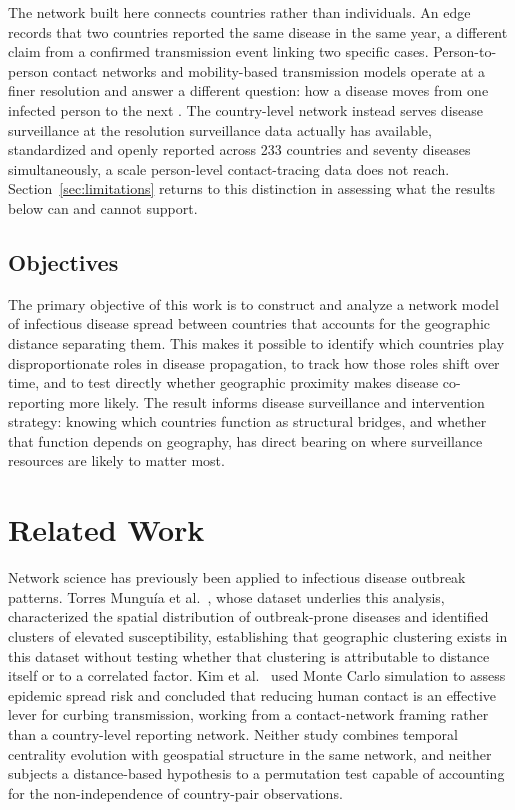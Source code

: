 \documentclass[11pt]{article}
\begin{document}
The network built here connects countries rather than individuals. An edge records that two
countries reported the same disease in the same year, a different claim from a confirmed
transmission event linking two specific cases. Person-to-person contact networks and
mobility-based transmission models operate at a finer resolution and answer a different
question: how a disease moves from one infected person to the next \cite{balcan2009}. The
country-level network instead serves disease surveillance at the resolution surveillance
data actually has available, standardized and openly reported across 233 countries and
seventy diseases simultaneously, a scale person-level contact-tracing data does not reach.
Section~\ref{sec:limitations} returns to this distinction in assessing what the results
below can and cannot support.

\subsection{Objectives}

The primary objective of this work is to construct and analyze a network model of
infectious disease spread between countries that accounts for the geographic distance
separating them. This makes it possible to identify which countries play disproportionate
roles in disease propagation, to track how those roles shift over time, and to test
directly whether geographic proximity makes disease co-reporting more likely. The result
informs disease surveillance and intervention strategy: knowing which countries function as
structural bridges, and whether that function depends on geography, has direct bearing on
where surveillance resources are likely to matter most.

\section{Related Work}

Network science has previously been applied to infectious disease outbreak patterns.
Torres Mungu\'{i}a et al.~\cite{torres2022}, whose dataset underlies this analysis,
characterized the spatial distribution of outbreak-prone diseases and identified clusters
of elevated susceptibility, establishing that geographic clustering exists in this dataset
without testing whether that clustering is attributable to distance itself or to a
correlated factor. Kim et al.~\cite{kim2021} used Monte Carlo simulation to assess epidemic
spread risk and concluded that reducing human contact is an effective lever for curbing
transmission, working from a contact-network framing rather than a country-level reporting
network. Neither study combines temporal centrality evolution with geospatial structure in
the same network, and neither subjects a distance-based hypothesis to a permutation test
capable of accounting for the non-independence of country-pair observations.
\end{document}
